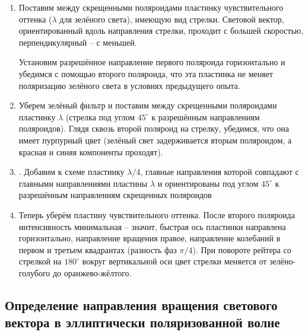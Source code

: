 	\begin{enumerate}
		\item Поставим между скрещенными поляроидами пластинку чувствительного оттенка ($\lambda$ для зелёного света), имеющую вид стрелки. Световой вектор, ориентированный вдоль направления стрелки, проходит с большей скоростью, перпендикулярный -- с меньшей.
		
		Установим разрешённое направление первого поляроида горизонтально и убедимся с помощью второго поляроида, что эта пластинка
		не меняет поляризацию зелёного света в условиях предыдущего опыта.
		
		\item Уберем зелёный фильтр и поставим между скрещенными поляроидами
		пластинку $\lambda$ (стрелка под углом $45^{\circ}$ к разрешённым направлениям поляроидов). Глядя сквозь второй поляроид на стрелку, убедимся, что она имеет пурпурный цвет (зелёный свет задерживается вторым поляроидом, а красная и синяя компоненты проходят).
		
		\item . Добавим к схеме пластинку $\lambda/4$, главные направления
		которой совпадают с главными направлениями пластины $\lambda$ и ориентированы под углом $45^{\circ}$ к разрешённым направлениям скрещенных поляроидов
		
		\item Теперь уберём пластину чувствительного оттенка. После второго поляроида интенсивность минимальная -- значит, быстрая ось пластинки направлена горизонтально, направление вращения правое, направление колебаний в первом и третьем квадрантах (разность фаз $\pi/4$). При повороте рейтера со стрелкой на $180^{\circ}$ вокруг вертикальной оси
		цвет стрелки меняется от зелёно-голубого до оранжево-жёлтого.
		
	\end{enumerate}
	
	\subsection*{Определение направления вращения светового вектора в эллиптически поляризованной волне}
	

